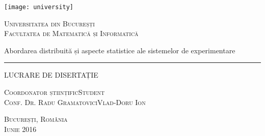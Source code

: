 \begin{titlepage}
	\begin{center}

		\texttt{[image: university]}

		\vspace{0.5cm}
		\LARGE \textsc{Universitatea din Bucureșți}
		\\
		\vspace{0.5cm}
		\Large \textsc{Facultatea de Matematică și Informatică}

		\vfill

		\Huge Abordarea distribuită și aspecte statistice ale sistemelor de experimentare
		\rule{\textwidth}{1pt}
		\Large LUCRARE DE DISERTAȚIE

		\vfill

		\Large
		\textsc{Coordonator științific}\hfill \textsc{Student}
		\\
		\large
		\textsc{Conf. Dr. Radu Gramatovici}\hfill \textsc{Vlad-Doru Ion}
	
		\vspace{1.5cm}
		\textsc{Bucureșți, România}\\
		\textsc{Iunie 2016}

	\end{center}
\end{titlepage}
 
